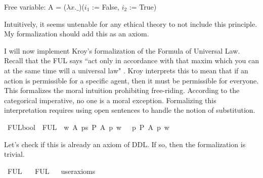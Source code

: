 \begin{isabellebody}
{  Free variable:
    A = ($\lambda x. \_$)($i_1$ := False, $i_2$ := True)\color{black}%
}%
\endisatagproof
{\isafoldproof}%
%
\isadelimproof
%
\endisadelimproof
%
\begin{isamarkuptext}%
Intuitively, it seems untenable for any ethical theory to not include this principle. My 
formalization should add this as an axiom.%
\end{isamarkuptext}\isamarkuptrue%
%
\isadelimdocument
%
\endisadelimdocument
%
\isatagdocument
%
\isamarkuptrue%
%
\endisatagdocument
{\isafolddocument}%
%
\isadelimdocument
%
\endisadelimdocument
%
\begin{isamarkuptext}%
I will now implement Kroy's formalization of the Formula of Universal Law. Recall that the FUL says
``act only in accordance with that maxim which you can at the same time will a universal law" \cite{groundwork}.
Kroy interprets this to mean that if an action is permissible for a specific agent, then it must be permissible for everyone.
This formalizes the moral intuition prohibiting free-riding. According to the categorical imperative, no one is a moral exception.
Formalizing this interpretation requires using open sentences to handle the notion of substitution.%
\end{isamarkuptext}\isamarkuptrue%
\isamarkupfalse%
\ FUL{\isacharcolon}{\isacharcolon}{\isachardoublequoteopen}bool{\isachardoublequoteclose}\ \ {\isachardoublequoteopen}FUL\ {\isasymequiv}\ {\isasymforall}w\ A{\isachardot}\ {\isacharparenleft}{\isacharparenleft}{\isasymexists}p{\isacharcolon}{\isacharcolon}s{\isachardot}\ {\isacharparenleft}{\isacharparenleft}P\ {\isacharbraceleft}A\ p{\isacharbraceright}{\isacharparenright}\ w{\isacharparenright}{\isacharparenright}\ \ {\isasymlongrightarrow}{\isacharparenleft}\ {\isacharparenleft}{\isasymforall}p{\isachardot}{\isacharparenleft}\ P\ {\isacharbraceleft}A\ p{\isacharbraceright}{\isacharparenright}\ w{\isacharparenright}{\isacharparenright}{\isacharparenright}\ {\isachardoublequoteclose}\isanewline
\isanewline
%
%
\begin{isamarkuptext}%
Let's check if this is already an axiom of DDL. If so, then the formalization is trivial.%
\end{isamarkuptext}\isamarkuptrue%
\isamarkupfalse%
\ FUL{\isacharcolon}\isanewline
\ \ \ FUL\isanewline
\ \ \isamarkupfalse%
{\isacharbrackleft}user{\isacharunderscore}axioms{\isacharbrackright}%
\isadelimproof
\ %
\endisadelimproof
%
\isatagproof
{}\isamarkupfalse%
\isanewline
%
\end{isabellebody}
